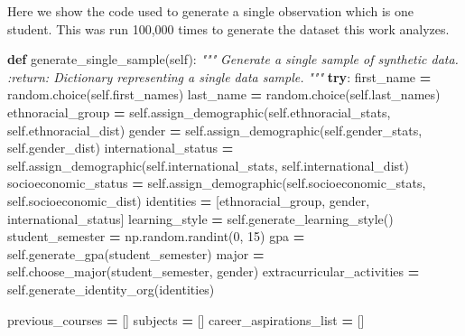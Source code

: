 \documentclass[
  twocolumn]{article}
\newenvironment{Shaded}{\begin{snugshade}}{\end{snugshade}}
\newcommand{\CommentTok}[1]{\textcolor[rgb]{0.56,0.35,0.01}{\textit{#1}}}
\newcommand{\ControlFlowTok}[1]{\textcolor[rgb]{0.13,0.29,0.53}{\textbf{#1}}}
\newcommand{\DecValTok}[1]{\textcolor[rgb]{0.00,0.00,0.81}{#1}}
\newcommand{\KeywordTok}[1]{\textcolor[rgb]{0.13,0.29,0.53}{\textbf{#1}}}
\newcommand{\NormalTok}[1]{#1}
\newcommand{\OperatorTok}[1]{\textcolor[rgb]{0.81,0.36,0.00}{\textbf{#1}}}
\newcommand{\VariableTok}[1]{\textcolor[rgb]{0.00,0.00,0.00}{#1}}
\begin{document}
Here we show the code used to generate a single observation which is one
student. This was run 100,000 times to generate the dataset this work
analyzes.

\begin{Shaded}
\begin{Highlighting}[]
\KeywordTok{def}\NormalTok{ generate\_single\_sample(}\VariableTok{self}\NormalTok{):}
        \CommentTok{"""}
\CommentTok{        Generate a single sample of synthetic data.}
\CommentTok{        :return: Dictionary representing a single data sample.}
\CommentTok{        """}
        \ControlFlowTok{try}\NormalTok{:}
\NormalTok{            first\_name }\OperatorTok{=}\NormalTok{ random.choice(}\VariableTok{self}\NormalTok{.first\_names)}
\NormalTok{            last\_name }\OperatorTok{=}\NormalTok{ random.choice(}\VariableTok{self}\NormalTok{.last\_names)}
\NormalTok{            ethnoracial\_group }\OperatorTok{=} \VariableTok{self}\NormalTok{.assign\_demographic(}\VariableTok{self}\NormalTok{.ethnoracial\_stats, }\VariableTok{self}\NormalTok{.ethnoracial\_dist)}
\NormalTok{            gender }\OperatorTok{=} \VariableTok{self}\NormalTok{.assign\_demographic(}\VariableTok{self}\NormalTok{.gender\_stats, }\VariableTok{self}\NormalTok{.gender\_dist)}
\NormalTok{            international\_status }\OperatorTok{=} \VariableTok{self}\NormalTok{.assign\_demographic(}\VariableTok{self}\NormalTok{.international\_stats, }\VariableTok{self}\NormalTok{.international\_dist)}
\NormalTok{            socioeconomic\_status }\OperatorTok{=} \VariableTok{self}\NormalTok{.assign\_demographic(}\VariableTok{self}\NormalTok{.socioeconomic\_stats, }\VariableTok{self}\NormalTok{.socioeconomic\_dist)}
\NormalTok{            identities }\OperatorTok{=}\NormalTok{ [ethnoracial\_group, gender, international\_status]}
\NormalTok{            learning\_style }\OperatorTok{=} \VariableTok{self}\NormalTok{.generate\_learning\_style()}
\NormalTok{            student\_semester }\OperatorTok{=}\NormalTok{ np.random.randint(}\DecValTok{0}\NormalTok{, }\DecValTok{15}\NormalTok{)}
\NormalTok{            gpa }\OperatorTok{=} \VariableTok{self}\NormalTok{.generate\_gpa(student\_semester)}
\NormalTok{            major }\OperatorTok{=} \VariableTok{self}\NormalTok{.choose\_major(student\_semester, gender)}
\NormalTok{            extracurricular\_activities }\OperatorTok{=} \VariableTok{self}\NormalTok{.generate\_identity\_org(identities)}

\NormalTok{            previous\_courses }\OperatorTok{=}\NormalTok{ []}
\NormalTok{            subjects }\OperatorTok{=}\NormalTok{ []}
\NormalTok{            career\_aspirations\_list }\OperatorTok{=}\NormalTok{ []}


\end{Highlighting}
\end{Shaded}
\end{document}
